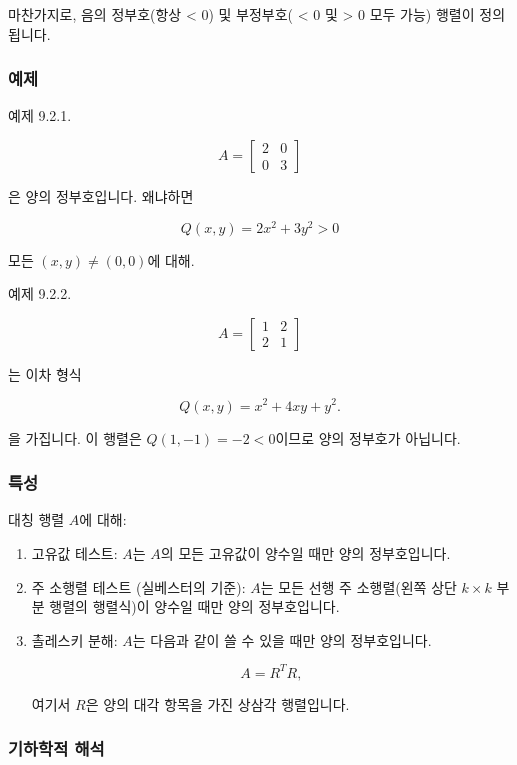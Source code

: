 \documentclass[
  12pt,
  a4paper,
]{article}
\begin{document}
마찬가지로, 음의 정부호(항상 < 0) 및 부정부호( < 0 및 > 0 모두 가능) 행렬이 정의됩니다.

\subsubsection{예제}\label{examples-10}

예제 9.2.1.

\[A = \begin{bmatrix}
2 & 0 \\
0 & 3 \end{bmatrix}\]

은 양의 정부호입니다. 왜냐하면

\[Q(x,y) = 2x^2 + 3y^2 > 0\]

모든 \((x,y) \neq (0,0)\)에 대해.

예제 9.2.2.

\[A = \begin{bmatrix}
1 & 2 \\
2 & 1 \end{bmatrix}\]

는 이차 형식

\[Q(x,y) = x^2 + 4xy + y^2.\]

을 가집니다. 이 행렬은 \(Q(1,-1) = -2 < 0\)이므로 양의 정부호가 아닙니다.

\subsubsection{특성}\label{characterizations}

대칭 행렬 \(A\)에 대해:

\begin{enumerate}
\def\labelenumi{\arabic{enumi}.}
\item
  고유값 테스트: \(A\)는 \(A\)의 모든 고유값이 양수일 때만 양의 정부호입니다.
\item
  주 소행렬 테스트 (실베스터의 기준): \(A\)는 모든 선행 주 소행렬(왼쪽 상단 \(k \times k\) 부분 행렬의 행렬식)이 양수일 때만 양의 정부호입니다.
\item
  촐레스키 분해: \(A\)는 다음과 같이 쓸 수 있을 때만 양의 정부호입니다.

  \[A = R^T R,\]

  여기서 \(R\)은 양의 대각 항목을 가진 상삼각 행렬입니다.
\end{enumerate}

\subsubsection{기하학적 해석}\label{geometric-interpretation-21}
\end{document}
